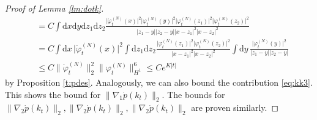 \documentclass[11pt,a4paper]{article}
\newcommand{\di}{\textrm{d}}		%
\newcommand{\ph}{\varphi_t^{(N)}}	%
\newcommand{\phdot}{\dot{\varphi}_t^{(N)}}	%
\begin{document}
\begin{proof}[Proof of Lemma \ref{lm:dotk}]
\begin{align*}
& = C \int \di x \di y \di z_1 \di z_2 \frac{\lvert\phdot(x)\rvert^2 \lvert \ph(y)\rvert^2 \lvert \ph(z_1)\rvert^2 \lvert \ph(z_2)\rvert^2}{\lvert z_1-y\rvert \lvert z_2 -y\rvert \lvert x-z_1\rvert^2 \lvert x-z_2\rvert^2} \\
& = C \int \di x\, \lvert\phdot(x)\rvert^2 \int \di z_1 \di z_2 \frac{\lvert \ph(z_1)\rvert^2 \lvert \ph(z_2)\rvert^2}{\lvert x-z_1\rvert^2 \lvert x-z_2\rvert^2} \int \di y \, \frac{\lvert \ph(y)\rvert^2}{\lvert z_1-y\rvert \lvert z_2 - y\rvert} \\ &\leq C \| \phdot \|_2^2 \| \ph \|_{H^1}^6 \leq C e^{K|t|}
 \end{align*}
 by Proposition \ref{t:pdes}. Analogously, we can also bound the contribution \eqref{eq:kk3}. 
This shows the bound for $\| \nabla_1 \dot p (k_t) \|_2$. The bounds for $\| \nabla_2 \dot p (k_t) \|_2,\| \nabla_2 \dot p (k_t) \|_2, \| \nabla_2 \dot p (k_t) \|_2$ are proven similarly.


\end{proof}
\end{document}
